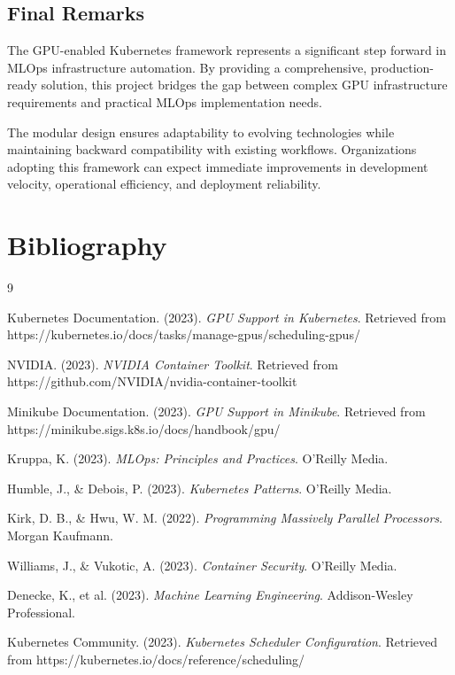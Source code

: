 \documentclass[12pt,a4paper]{report}
\begin{document}
\section{Final Remarks}
The GPU-enabled Kubernetes framework represents a significant step forward in MLOps infrastructure automation. By providing a comprehensive, production-ready solution, this project bridges the gap between complex GPU infrastructure requirements and practical MLOps implementation needs.

The modular design ensures adaptability to evolving technologies while maintaining backward compatibility with existing workflows. Organizations adopting this framework can expect immediate improvements in development velocity, operational efficiency, and deployment reliability.

\chapter{Bibliography}
\label{chap:bibliography}

\begin{thebibliography}{9}

Kubernetes Documentation. (2023). \textit{GPU Support in Kubernetes}. Retrieved from https://kubernetes.io/docs/tasks/manage-gpus/scheduling-gpus/

NVIDIA. (2023). \textit{NVIDIA Container Toolkit}. Retrieved from https://github.com/NVIDIA/nvidia-container-toolkit

Minikube Documentation. (2023). \textit{GPU Support in Minikube}. Retrieved from https://minikube.sigs.k8s.io/docs/handbook/gpu/

Kruppa, K. (2023). \textit{MLOps: Principles and Practices}. O'Reilly Media.

Humble, J., \& Debois, P. (2023). \textit{Kubernetes Patterns}. O'Reilly Media.

Kirk, D. B., \& Hwu, W. M. (2022). \textit{Programming Massively Parallel Processors}. Morgan Kaufmann.

Williams, J., \& Vukotic, A. (2023). \textit{Container Security}. O'Reilly Media.

Denecke, K., et al. (2023). \textit{Machine Learning Engineering}. Addison-Wesley Professional.

Kubernetes Community. (2023). \textit{Kubernetes Scheduler Configuration}. Retrieved from https://kubernetes.io/docs/reference/scheduling/

\end{thebibliography}
\end{document}
